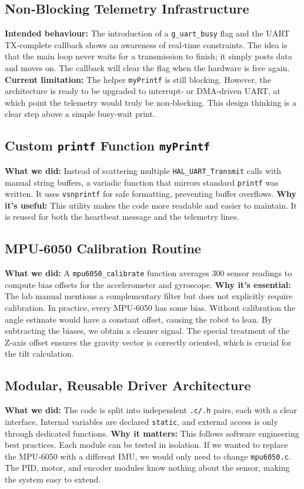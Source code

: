 \documentclass[12pt,a4paper]{article}
\begin{document}
	\subsection{Non‑Blocking Telemetry Infrastructure}
	\textbf{Intended behaviour:} The introduction of a \texttt{g\_uart\_busy} flag and the UART TX‑complete callback shows an awareness of real‑time constraints. The idea is that the main loop never waits for a transmission to finish; it simply posts data and moves on. The callback will clear the flag when the hardware is free again.  
	\textbf{Current limitation:} The helper \texttt{myPrintf} is still blocking. However, the architecture is ready to be upgraded to interrupt‑ or DMA‑driven UART, at which point the telemetry would truly be non‑blocking. This design thinking is a clear step above a simple busy‑wait print.
	
	\subsection{Custom \texttt{printf} Function \texttt{myPrintf}}
	\textbf{What we did:} Instead of scattering multiple \texttt{HAL\_UART\_Transmit} calls with manual string buffers, a variadic function that mirrors standard \texttt{printf} was written. It uses \texttt{vsnprintf} for safe formatting, preventing buffer overflows.  
	\textbf{Why it’s useful:} This utility makes the code more readable and easier to maintain. It is reused for both the heartbeat message and the telemetry lines.
	
	\subsection{MPU‑6050 Calibration Routine}
	\textbf{What we did:} A \texttt{mpu6050\_calibrate} function averages 300 sensor readings to compute bias offsets for the accelerometer and gyroscope.  
	\textbf{Why it’s essential:} The lab manual mentions a complementary filter but does not explicitly require calibration. In practice, every MPU‑6050 has some bias. Without calibration the angle estimate would have a constant offset, causing the robot to lean. By subtracting the biases, we obtain a cleaner signal. The special treatment of the Z‑axis offset ensures the gravity vector is correctly oriented, which is crucial for the tilt calculation.
	
	\subsection{Modular, Reusable Driver Architecture}
	\textbf{What we did:} The code is split into independent \texttt{.c/.h} pairs, each with a clear interface. Internal variables are declared \texttt{static}, and external access is only through dedicated functions.  
	\textbf{Why it matters:} This follows software engineering best practices. Each module can be tested in isolation. If we wanted to replace the MPU‑6050 with a different IMU, we would only need to change \texttt{mpu6050.c}. The PID, motor, and encoder modules know nothing about the sensor, making the system easy to extend.
	
\end{document}
